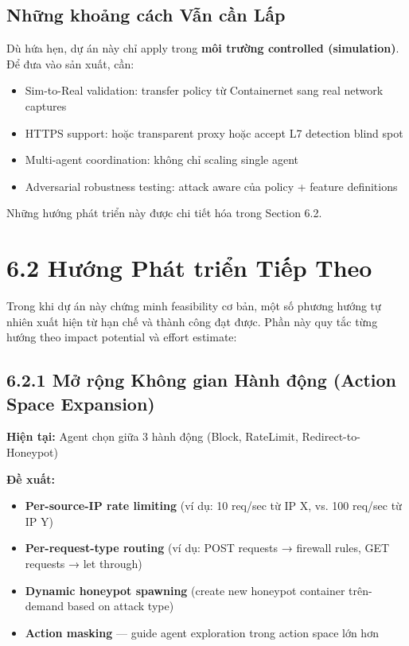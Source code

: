\documentclass[12pt,a4paper,twoside]{report}
\begin{document}
{{{{{{{{{{{{{\subsection{Những khoảng cách Vẫn cần Lấp}

Dù hứa hẹn, dự án này chỉ apply trong \textbf{môi trường controlled (simulation)}. Để đưa vào sản xuất, cần:
\begin{itemize}
\item Sim-to-Real validation: transfer policy từ Containernet sang real network captures
\item HTTPS support: hoặc transparent proxy hoặc accept L7 detection blind spot
\item Multi-agent coordination: không chỉ scaling single agent
\item Adversarial robustness testing: attack aware của policy + feature definitions
\end{itemize}

Những hướng phát triển này được chi tiết hóa trong Section 6.2.


\section{6.2 Hướng Phát triển Tiếp Theo}

Trong khi dự án này chứng minh feasibility cơ bản, một số phương hướng tự nhiên xuất hiện từ hạn chế và thành công đạt được. Phần này quy tắc từng hướng theo impact potential và effort estimate:

\subsection{6.2.1 Mở rộng Không gian Hành động (Action Space Expansion)}

\textbf{Hiện tại:} Agent chọn giữa 3 hành động (Block, RateLimit, Redirect-to-Honeypot)

\textbf{Đề xuất:}
\begin{itemize}
\item \textbf{Per-source-IP rate limiting} (ví dụ: 10 req/sec từ IP X, vs. 100 req/sec từ IP Y)
\item \textbf{Per-request-type routing} (ví dụ: POST requests → firewall rules, GET requests → let through)
\item \textbf{Dynamic honeypot spawning} (create new honeypot container trên-demand based on attack type)
\item \textbf{Action masking} — guide agent exploration trong action space lớn hơn
\end{itemize}

}}}}}}}}}}}}}
\end{document}
